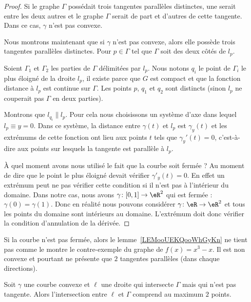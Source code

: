 \begin{proof}
	Si le graphe \( \Gamma\) possédait trois tangentes parallèles distinctes, une serait entre les deux autres et le graphe \( \Gamma\) serait de part et d'autres de cette tangente. Dans ce cas, \( \gamma\) n'est pas convexe.

	Nous montrons maintenant que si \( \gamma\) n'est pas convexe, alors elle possède trois tangentes parallèles distinctes. Pour \( p\in \Gamma\) tel que \( \Gamma\) soit des deux côtés de \( l_p\).

	Soient \( \Gamma_1\) et \( \Gamma_2\) les parties de \( \Gamma\) délimitées par \( l_p\). Nous notons \( q_i\) le point de \( \Gamma_i\) le plus éloigné de la droite \( l_p\), il existe parce que \( G\) est compact et que la fonction distance à \( l_p\) est continue sur \( \Gamma\). Les points \( p\), \( q_1\) et \( q_2\) sont distincts (sinon \( l_p\) ne couperait pas \( \Gamma\) en deux parties).

	Montrons que \( l_{q_i}\parallel l_p\). Pour cela nous choisissons un système d'axe dans lequel \( l_p\equiv y=0\). Dans ce système, la distance entre \( \gamma(t)\) et \( l_p\) est \( \gamma_y(t)\) et les extrémums de cette fonction ont lieu aux points \( t\) tels que \( \gamma_y'(t)=0\), c'est-à-dire aux points sur lesquels la tangente est parallèle à \( l_p\).

	À quel moment avons nous utilisé le fait que la courbe soit fermée ? Au moment de dire que le point le plus éloigné devait vérifier \( \gamma'_y(t)=0\). En effet un extrémum peut ne pas vérifier cette condition si il n'est pas à l'intérieur du domaine. Dans notre cas, nous avons \( \gamma\colon \mathopen[ 0 , 1 \mathclose]\to \eR^2\) qui est fermée :  \( \gamma(0)=\gamma(1)\). Donc en réalité nous pouvons considérer \( \gamma\colon \eR\to \eR^2\) et tous les points du domaine sont intérieurs au domaine. L'extrémum doit donc vérifier la condition d'annulation de la dérivée.
\end{proof}

\begin{example}
	Si la courbe n'est pas fermée, alors le lemme~\ref{LEMooUEKQooWhGyKn} ne tient pas comme le montre le contre-exemple du graphe de \( f(x)=x^3-x\). Il est non convexe et pourtant ne présente que \( 2\) tangentes parallèles (dans chaque directions).
\end{example}

\begin{lemma}       \label{LEMooCSXCooIDPiKW}
	Soit \( \gamma\) une courbe convexe et \( \ell\) une droite qui intersecte \( \Gamma\) mais qui n'est pas tangente. Alors l'intersection entre \( \ell\) et \( \Gamma\) comprend au maximum \( 2\) points.
\end{lemma}

